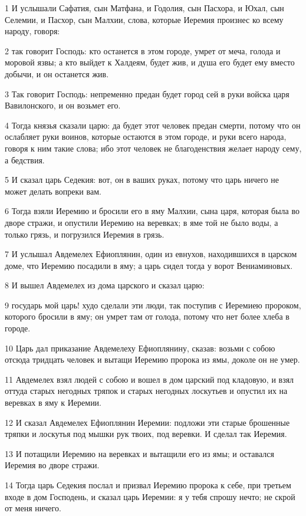 \par 1 И услышали Сафатия, сын Матфана, и Годолия, сын Пасхора, и Юхал, сын Селемии, и Пасхор, сын Малхии, слова, которые Иеремия произнес ко всему народу, говоря:
\par 2 так говорит Господь: кто останется в этом городе, умрет от меча, голода и моровой язвы; а кто выйдет к Халдеям, будет жив, и душа его будет ему вместо добычи, и он останется жив.
\par 3 Так говорит Господь: непременно предан будет город сей в руки войска царя Вавилонского, и он возьмет его.
\par 4 Тогда князья сказали царю: да будет этот человек предан смерти, потому что он ослабляет руки воинов, которые остаются в этом городе, и руки всего народа, говоря к ним такие слова; ибо этот человек не благоденствия желает народу сему, а бедствия.
\par 5 И сказал царь Седекия: вот, он в ваших руках, потому что царь ничего не может делать вопреки вам.
\par 6 Тогда взяли Иеремию и бросили его в яму Малхии, сына царя, которая была во дворе стражи, и опустили Иеремию на веревках; в яме той не было воды, а только грязь, и погрузился Иеремия в грязь.
\par 7 И услышал Авдемелех Ефиоплянин, один из евнухов, находившихся в царском доме, что Иеремию посадили в яму; а царь сидел тогда у ворот Вениаминовых.
\par 8 И вышел Авдемелех из дома царского и сказал царю:
\par 9 государь мой царь! худо сделали эти люди, так поступив с Иеремиею пророком, которого бросили в яму; он умрет там от голода, потому что нет более хлеба в городе.
\par 10 Царь дал приказание Авдемелеху Ефиоплянину, сказав: возьми с собою отсюда тридцать человек и вытащи Иеремию пророка из ямы, доколе он не умер.
\par 11 Авдемелех взял людей с собою и вошел в дом царский под кладовую, и взял оттуда старых негодных тряпок и старых негодных лоскутьев и опустил их на веревках в яму к Иеремии.
\par 12 И сказал Авдемелех Ефиоплянин Иеремии: подложи эти старые брошенные тряпки и лоскутья под мышки рук твоих, под веревки. И сделал так Иеремия.
\par 13 И потащили Иеремию на веревках и вытащили его из ямы; и оставался Иеремия во дворе стражи.
\par 14 Тогда царь Седекия послал и призвал Иеремию пророка к себе, при третьем входе в дом Господень, и сказал царь Иеремии: я у тебя спрошу нечто; не скрой от меня ничего.
